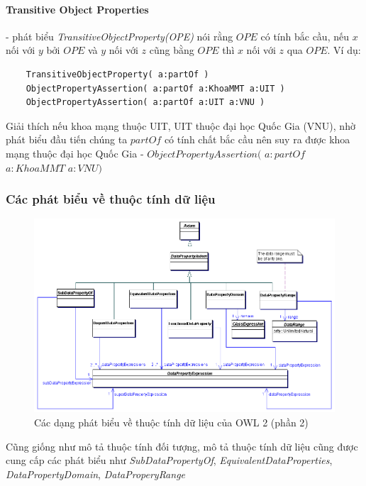 \paragraph{Transitive Object Properties} - phát biểu \textit{TransitiveObjectProperty(OPE)} nói rằng $OPE$ có tính bắc cầu, nếu $x$ nối với $y$ bởi $OPE$ và $y$ nối với $z$ cũng bằng $OPE$ thì $x$ nối với $z$ qua $OPE$. Ví dụ:
\begin{verbatim}
	TransitiveObjectProperty( a:partOf ) 
	ObjectPropertyAssertion( a:partOf a:KhoaMMT a:UIT )
	ObjectPropertyAssertion( a:partOf a:UIT a:VNU )
\end{verbatim}
Giải thích nếu khoa mạng thuộc UIT, UIT thuộc đại học Quốc Gia (VNU), nhờ phát biểu đầu tiến chúng ta $partOf$ có tính chất bắc cầu nên suy ra được khoa mạng thuộc đại học Quốc Gia - $ObjectPropertyAssertion($ $a:partOf$ $a:KhoaMMT$ $a:VNU)$

\subsubsection{Các phát biểu về thuộc tính dữ liệu}
\begin{figure}[h]
	\centering
	\includegraphics[width=120mm]{Figures/datapropertyAxiom.png}
	\caption{Các dạng phát biểu về thuộc tính dữ liệu của OWL 2 (phần 2) \label{overflow}}
\end{figure}
Cũng giống như mô tả thuộc tính đối tượng, mô tả thuộc tính dữ liệu cũng được cung cấp các phát biểu như \textit{SubDataPropertyOf}, \textit{EquivalentDataProperties}, \textit{DataPropertyDomain}, \textit{DataProperyRange}

